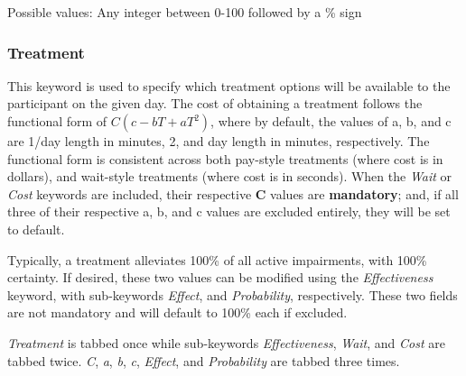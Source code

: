 \documentclass{article}
\begin{document}
 \newline
\indent Possible values: \newline
\indent\indent Any integer between 0-100 followed by a \% sign \newline
    

\subsubsection*{Treatment}
This keyword is used to specify which treatment options will be available to the participant on the given day. The cost of obtaining a treatment follows the functional form of $C(c - bT + aT^2)$, where by default, the values of a, b, and c are 1\slash day length in minutes, 2, and day length in minutes, respectively. The functional form is consistent across both pay-style treatments (where cost is in dollars), and wait-style treatments (where cost is in seconds). When the \textit{Wait} or \textit{Cost} keywords are included, their respective \textbf{C} values are \textbf{mandatory}; and, if all three of their respective a, b, and c values are excluded entirely, they will be set to default. 

Typically, a treatment alleviates 100\% of all active impairments, with 100\% certainty. If desired, these two values can be modified using the \textit{Effectiveness} keyword, with sub-keywords \textit{Effect}, and \textit{Probability}, respectively. These two fields are not mandatory and will default to 100\% each if excluded.

\textit{Treatment} is tabbed once while sub-keywords \textit{Effectiveness}, \textit{Wait}, and \textit{Cost} are tabbed twice. \textit{C}, \textit{a}, \textit{b}, \textit{c}, \textit{Effect}, and \textit{Probability} are tabbed three times. \newline

\end{document}
